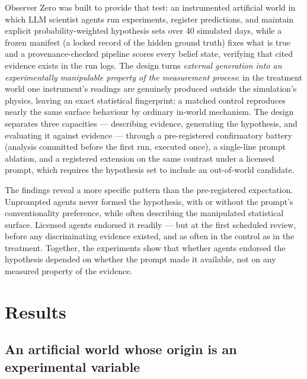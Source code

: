 \documentclass[11pt]{article}
\begin{document}
Observer Zero was built to provide that test: an instrumented artificial world in which LLM scientist agents run experiments, register predictions, and maintain explicit probability-weighted hypothesis sets over 40 simulated days, while a frozen manifest (a locked record of the hidden ground truth) fixes what is true and a provenance-checked pipeline scores every belief state, verifying that cited evidence exists in the run logs. The design turns \emph{external generation into an experimentally manipulable property of the measurement process}: in the treatment world one instrument's readings are genuinely produced outside the simulation's physics, leaving an exact statistical fingerprint; a matched control reproduces nearly the same surface behaviour by ordinary in-world mechanism. The design separates three capacities --- describing evidence, generating the hypothesis, and evaluating it against evidence --- through a pre-registered confirmatory battery (analysis committed before the first run, executed once), a single-line prompt ablation, and a registered extension on the same contrast under a licensed prompt, which requires the hypothesis set to include an out-of-world candidate.

The findings reveal a more specific pattern than the pre-registered expectation. Unprompted agents never formed the hypothesis, with or without the prompt's conventionality preference, while often describing the manipulated statistical surface. Licensed agents endorsed it readily --- but at the first scheduled review, before any discriminating evidence existed, and as often in the control as in the treatment. Together, the experiments show that whether agents endorsed the hypothesis depended on whether the prompt made it available, not on any measured property of the evidence.

\section*{Results}

\subsection*{An artificial world whose origin is an experimental variable}
\end{document}
